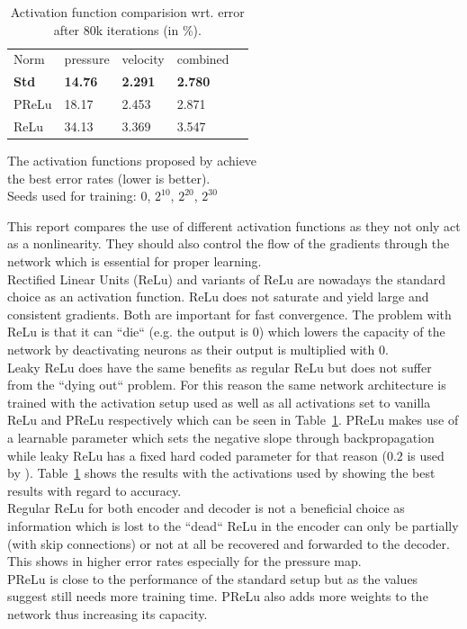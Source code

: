 \documentclass[acmtog]{techreportacmart}
\begin{document}
\begin{table}[h]
\caption{Activation function comparision wrt. error \\ after 80k iterations (in \%).}
\label{tab:two}
\begin{center}
\begin{tabular}{l|l|l|l|l}
  \toprule
  Norm   & pressure   &	velocity    & combined \\
  \bf Std	 & \bf 14.76	  & \bf 2.291		& \bf 2.780	   \\
  PReLu	 & 18.17	  & 2.453		& 2.871	   \\
  ReLu	 & 34.13	  & 3.369		& 3.547	   \\
  \bottomrule
\end{tabular}
\end{center}
\bigskip\centering
\footnotesize The activation functions proposed by \cite{Thuerey20} achieve \\ 
the best error rates (lower is better). \\
Seeds used for training: $0$, $2^{10}$, $2^{20}$, $2^{30}$

\end{table}%

This report compares the use of different activation functions as they not only act as a nonlinearity. 
They should also control the flow of the gradients through the network which is essential for proper learning.\\
Rectified Linear Units (ReLu) and variants of ReLu are nowadays the standard choice as an activation function. 
ReLu does not saturate and yield large and consistent gradients. Both are important for fast convergence. 
The problem with ReLu is that it can ``die`` (e.g. the output is 0) which lowers the capacity of the 
network by deactivating neurons as their output is multiplied with 0.\\
Leaky ReLu does have the same benefits as regular ReLu but does not suffer from the ``dying out`` problem. 
For this reason the same network architecture is trained with the activation setup \cite{Thuerey20} 
used as well as all activations set to vanilla ReLu and PReLu respectively which can be seen in 
Table~\ref{tab:two}. PReLu makes use of a learnable parameter which sets the negative slope through 
backpropagation while leaky ReLu has a fixed hard coded parameter for that reason ($0.2$ is used 
by \cite{Thuerey20}). Table~\ref{tab:two} shows the results with the activations used by \cite{Thuerey20} 
showing the best results with regard to accuracy. \\
Regular ReLu for both encoder and decoder is not a beneficial choice as information which is lost to 
the ``dead`` ReLu in the encoder can only be partially (with skip connections) or not at all be recovered 
and forwarded to the decoder. This shows in higher error rates especially for the pressure map. \\
PReLu is close to the performance of the standard setup but as the values suggest still needs more 
training time. PReLu also adds more weights to the network thus increasing its capacity. 
\end{document}
